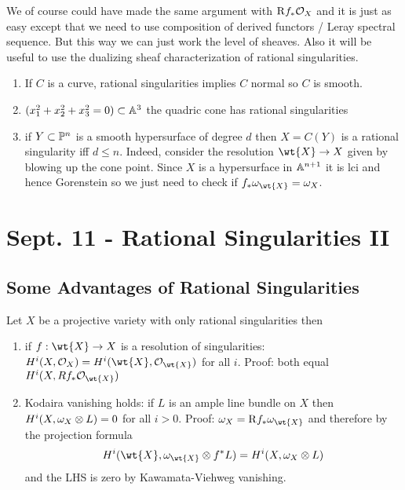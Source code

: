 \documentclass[12pt]{article}
\newcommand{\R}{\mathrm{R}}
\begin{document}
\begin{rmk}
We of course could have made the same argument with $\R f_* \struct{X}$ and it is just as easy except that we need to use composition of derived functors / Leray spectral sequence. But this way we can just work the level of sheaves. Also it will be useful to use the dualizing sheaf characterization of rational singularities. 
\end{rmk}

\begin{example}
\begin{enumerate}
\item
If $C$ is a curve, rational singularities implies $C$ normal so $C$ is smooth.
\item 
$(x_1^2 + x_2^2 + x_3^2 = 0) \subset \A^3$ the quadric cone has rational singularities
\item if $Y \subset \P^n$ is a smooth hypersurface of degree $d$ then $X = C(Y)$ is a rational singularity iff $d \le n$. Indeed, consider the resolution $\wt{X} \to X$ given by blowing up the cone point. Since $X$ is a hypersurface in $\A^{n+1}$ it is lci and hence Gorenstein so we just need to check if $f_* \omega_{\wt{X}} = \omega_X$. 
\end{enumerate}
\end{example}

\section{Sept. 11 - Rational Singularities II}

\subsection{Some Advantages of Rational Singularities}

Let $X$ be a projective variety with only rational singularities then
\begin{enumerate}
\item if $f : \wt{X} \to X$ is a resolution of singularities: $H^i(X, \struct{X}) = H^i(\wt{X}, \struct{\wt{X}})$ for all $i$. Proof: both equal $H^i(X, R f_* \struct{\wt{X}})$ 
\item Kodaira vanishing holds: if $L$ is an ample line bundle on $X$ then $H^i(X, \omega_X \ot L) = 0$ for all $i > 0$. Proof: $\omega_X = \R f_* \omega_{\wt{X}}$ and therefore by the projection formula
\[ H^i(\wt{X}, \omega_{\wt{X}} \ot f^* L) = H^i(X, \omega_X \ot L) \]
and the LHS is zero by Kawamata-Viehweg vanishing. 
\end{enumerate}
\end{document}
